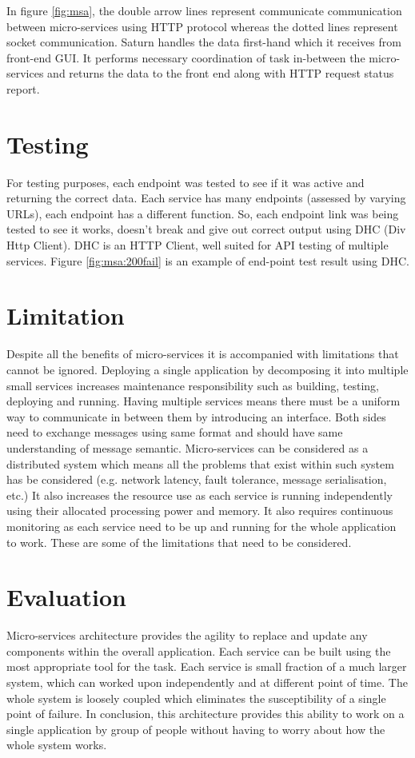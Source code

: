 In figure \ref{fig:msa}, the double arrow lines represent communicate communication between micro-services using HTTP protocol whereas the dotted lines represent socket communication.
Saturn handles the data first-hand which it receives from front-end GUI. It performs necessary coordination of task in-between the micro-services and returns the data to the front end along with HTTP request status report.
\section{Testing}
For testing purposes, each endpoint was tested to see if it was active and returning the correct data. Each service has many endpoints (assessed by varying URLs), each endpoint has a different function.  So, each endpoint link was being tested to see it works, doesn't break and give out correct output using DHC (Div Http Client). DHC is an HTTP Client, well suited for API testing of multiple services. Figure \ref{fig:msa:200fail} is an example of end-point test result using DHC.
\section{Limitation}
Despite all the benefits of micro-services it is accompanied with limitations that cannot be ignored. Deploying a single application by decomposing it into multiple small services increases maintenance responsibility such as building, testing, deploying and running. Having multiple services means there must be a uniform way to communicate in between them by introducing an interface. Both sides need to exchange messages using same format and should have same understanding of message semantic.
Micro-services can be considered as a distributed system which means all the problems that exist within such system has be considered (e.g. network latency, fault tolerance, message serialisation, etc.) \citep{microservices-notafreelunch} It also increases the resource use as each service is running independently using their allocated processing power and memory. It also requires continuous monitoring as each service need to be up and running for the whole application to work. These are some of the limitations that need to be considered.
\section{Evaluation}
Micro-services architecture provides the agility to replace and update any components within the overall application. Each service can be built using the most appropriate tool for the task. Each service is small fraction of a much larger system, which can worked upon independently and at different point of time. The whole system is loosely coupled which eliminates the susceptibility of a single point of failure. In conclusion, this architecture provides this ability to work on a single application by group of people without having to worry about how the whole system works.


